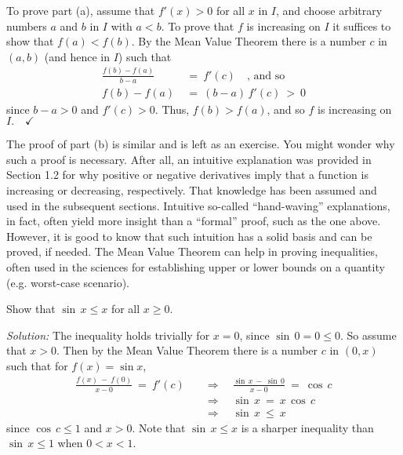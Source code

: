 To prove part (a), assume that $f'(x) > 0$ for all $x$ in $I$, and choose
arbitrary numbers $a$ and $b$ in $I$ with $a < b$. To prove that $f$ is
increasing on $I$ it suffices to show that $f(a) < f(b)$. By the Mean Value
Theorem there is a number $c$ in $(a,b)$ (and hence in $I$) such that
\begin{align*}
\frac{f(b) - f(a)}{b - a} ~&=~ f'(c) \quad\text{, and so}\\[6pt]
f(b) - f(a) ~&=~ (b-a)\,f'(c) ~>~ 0
\end{align*}
since $b-a>0$ and $f'(c)>0$. Thus, $f(b) > f(a)$, and so $f$ is increasing on
$I.\quad\checkmark$

The proof of part (b) is similar and is left as an exercise. 
You might wonder why such a proof is necessary. After all, an intuitive
explanation was provided in Section 1.2 for why positive or negative derivatives
imply that a function is increasing or decreasing, respectively. That knowledge
has been assumed and used in the subsequent sections. Intuitive so-called
``hand-waving'' explanations, in fact, often yield more insight than a
``formal'' proof, such as the one above. However, it is good to know that such
intuition has a solid basis and can be proved, if needed.
\newpage
The Mean Value Theorem can help in proving inequalities, often used in the
sciences for establishing upper or lower bounds on a quantity (e.g. worst-case
scenario).

\begin{exmp}\label{exmp:ineq1}
\noindent Show that $\sin\,x \le x$ for all $x \ge 0$.\vspace{1mm}
\par\noindent\emph{Solution:} The inequality holds trivially for $x=0$, since
$\sin\,0 = 0 \le 0$. So assume that $x > 0$. Then by the Mean Value Theorem
there is a number $c$ in $(0,x)$ such that for $f(x)=\sin x$,
\begin{align*}
\frac{f(x) ~-~ f(0)}{x - 0} ~=~ f'(c) \quad&\Rightarrow\quad
\frac{\sin\,x ~-~ \sin\,0}{x - 0} ~=~ \cos\,c\\[6pt]
&\Rightarrow\quad \sin\,x ~=~ x\,\cos\,c\\
&\Rightarrow\quad \sin\,x ~\le~ x
\end{align*}
since $\cos\,c \le 1$ and $x > 0$. Note that $\sin\,x \le x$ is a sharper
inequality than $\sin\,x \le 1$ when $0 < x < 1$.
\end{exmp}
\divider
\vspace{2mm}


